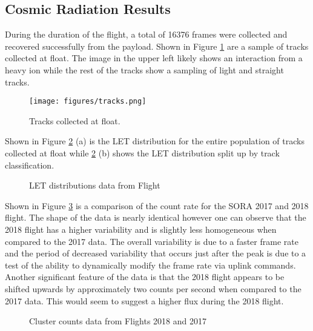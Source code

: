 \subsection{Cosmic Radiation Results}
\label{sec:Cosmic-Radiation-Results}

During the duration of the flight, a total of 16376 frames were collected and recovered successfully from the payload. Shown in Figure \ref{tracks} are a sample of tracks collected at float. The image in the upper left likely shows an interaction from a heavy ion while the rest of the tracks show a sampling of light and straight tracks. 


\begin{figure}[H]
	\begin{center}
	\texttt{[image: figures/tracks.png]}
	\caption{Tracks collected at float.}
	\label{tracks}
	\end{center}
\end{figure}

Shown in Figure \ref{let} (a) is the LET distribution for the entire population of tracks collected at float while \ref{let} (b) shows the LET distribution split up by track classification.

\begin{figure}[H]
\hfill
{}
\hfill
{}
\hfill
\caption{LET distributions data from Flight}
\label{let}
\end{figure}
\newpage

Shown in Figure \ref{counts} is a comparison of the count rate for the SORA 2017 and 2018 flight. The shape of the data is nearly identical however one can observe that the 2018 flight has a higher variability and is slightly less homogeneous when compared to the 2017 data. The overall variability is due to a faster frame rate and the period of decreased variability that occurs just after the peak is due to a test of the ability to dynamically modify the frame rate via uplink commands. Another significant feature of the data is that the 2018 flight appears to be shifted upwards by approximately two counts per second when compared to the 2017 data. This would seem to suggest a higher flux during the 2018 flight.
\begin{figure}[H]
\hfill
{}
\hfill
{}
\hfill
\caption{Cluster counts data from Flights 2018 and 2017}
\label{counts}
\end{figure}

